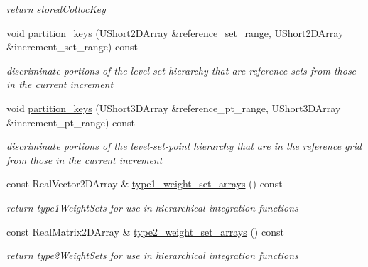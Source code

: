 \begin{DoxyCompactItemize}
\begin{DoxyCompactList}\small\item\em return stored\+Colloc\+Key \end{DoxyCompactList}\item 
void \hyperlink{classPecos_1_1HierarchSparseGridDriver_a490283a942bdcd3be233d62f6bd6049b}{partition\+\_\+keys} (U\+Short2\+D\+Array \&reference\+\_\+set\+\_\+range, U\+Short2\+D\+Array \&increment\+\_\+set\+\_\+range) const \label{classPecos_1_1HierarchSparseGridDriver_a490283a942bdcd3be233d62f6bd6049b}

\begin{DoxyCompactList}\small\item\em discriminate portions of the level-\/set hierarchy that are reference sets from those in the current increment \end{DoxyCompactList}\item 
void \hyperlink{classPecos_1_1HierarchSparseGridDriver_a3f4e05177766404f7144267d11827730}{partition\+\_\+keys} (U\+Short3\+D\+Array \&reference\+\_\+pt\+\_\+range, U\+Short3\+D\+Array \&increment\+\_\+pt\+\_\+range) const \label{classPecos_1_1HierarchSparseGridDriver_a3f4e05177766404f7144267d11827730}

\begin{DoxyCompactList}\small\item\em discriminate portions of the level-\/set-\/point hierarchy that are in the reference grid from those in the current increment \end{DoxyCompactList}\item 
const Real\+Vector2\+D\+Array \& \hyperlink{classPecos_1_1HierarchSparseGridDriver_aeff94c7a8a4c656d3817c5e6b7a5f270}{type1\+\_\+weight\+\_\+set\+\_\+arrays} () const \label{classPecos_1_1HierarchSparseGridDriver_aeff94c7a8a4c656d3817c5e6b7a5f270}

\begin{DoxyCompactList}\small\item\em return type1\+Weight\+Sets for use in hierarchical integration functions \end{DoxyCompactList}\item 
const Real\+Matrix2\+D\+Array \& \hyperlink{classPecos_1_1HierarchSparseGridDriver_a320a9c7281ba87d1c1795ba96720fc08}{type2\+\_\+weight\+\_\+set\+\_\+arrays} () const \label{classPecos_1_1HierarchSparseGridDriver_a320a9c7281ba87d1c1795ba96720fc08}

\begin{DoxyCompactList}\small\item\em return type2\+Weight\+Sets for use in hierarchical integration functions \end{DoxyCompactList}\end{DoxyCompactItemize}
